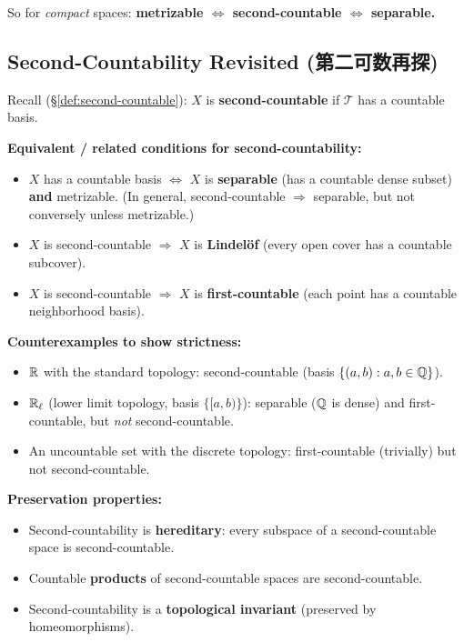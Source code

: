 \documentclass{article}
\begin{document}
So for \emph{compact} spaces: \textbf{metrizable $\iff$ second-countable
$\iff$ separable.}

\subsection{Second-Countability Revisited
(第二可数再探)}\label{def:second-countable-revisit}

Recall (\S\ref{def:second-countable}): $X$ is \textbf{second-countable}
if $\mathcal{T}$ has a countable basis.

\textbf{Equivalent / related conditions for second-countability:}
\begin{itemize}
  \item $X$ has a countable basis $\iff$ $X$ is \textbf{separable}
    (has a countable dense subset) \textbf{and} metrizable.
    (In general, second-countable $\Rightarrow$ separable, but not conversely
    unless metrizable.)
  \item $X$ is second-countable $\Rightarrow$ $X$ is \textbf{Lindel\"of}
    (every open cover has a countable subcover).
  \item $X$ is second-countable $\Rightarrow$ $X$ is \textbf{first-countable}
    (each point has a countable neighborhood basis).
\end{itemize}

\textbf{Counterexamples to show strictness:}
\begin{itemize}
  \item $\mathbb{R}$ with the standard topology: second-countable
    (basis $\{(a,b) : a, b \in \mathbb{Q}\}$).
  \item $\mathbb{R}_\ell$ (lower limit topology, basis $\{[a,b)\}$):
    separable ($\mathbb{Q}$ is dense) and first-countable, but \emph{not}
    second-countable.
  \item An uncountable set with the discrete topology:
    first-countable (trivially) but not second-countable.
\end{itemize}

\textbf{Preservation properties:}
\begin{itemize}
  \item Second-countability is \textbf{hereditary}: every subspace of a
    second-countable space is second-countable.
  \item Countable \textbf{products} of second-countable spaces are
    second-countable.
  \item Second-countability is a \textbf{topological invariant}
    (preserved by homeomorphisms).
\end{itemize}
\end{document}
